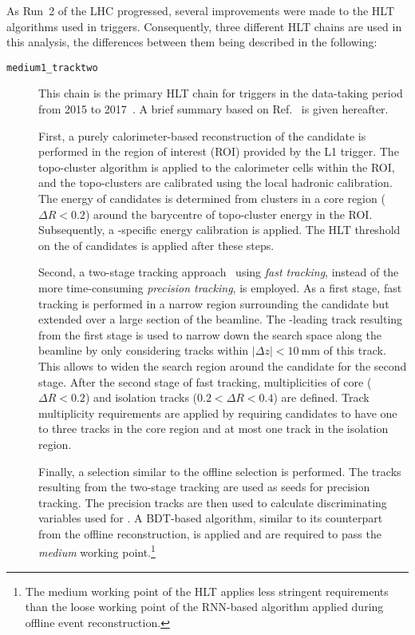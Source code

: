 As Run~2 of the LHC progressed, several improvements were made to the HLT
algorithms used in \tauhadvis triggers. Consequently, three different HLT chains
are used in this analysis, the differences between them being described in the
following:
\begin{description}

\item[\texttt{medium1\_tracktwo}] This chain is the primary HLT chain for
  \tauhadvis triggers in the data-taking period from 2015 to
  2017~\cite{ATL-DAQ-PUB-2016-001,ATL-DAQ-PUB-2017-001,ATL-DAQ-PUB-2018-002}. A
  brief summary based on Ref.~\cite{ATLAS-CONF-2017-061} is given hereafter.

  First, a purely calorimeter-based reconstruction of the \tauhadvis candidate
  is performed in the region of interest (ROI) provided by the L1 trigger. The
  topo-cluster algorithm is applied to the calorimeter cells within the ROI, and
  the topo-clusters are calibrated using the local hadronic calibration. The
  energy of \tauhadvis candidates is determined from clusters in a core region
  ($\Delta R < 0.2$) around the barycentre of topo-cluster energy in the
  ROI. Subsequently, a \tauhadvis-specific energy calibration is applied.
  The HLT threshold on the \pT of \tauhadvis candidates is applied after these
  steps.

  Second, a two-stage tracking approach~\cite{TRIG-2016-01,ATLAS-CONF-2017-061}
  using \emph{fast tracking}, instead of the more time-consuming \emph{precision
    tracking}, is employed. As a first stage, fast tracking is performed in a
  narrow region surrounding the \tauhadvis candidate but extended over a large
  section of the beamline. The \pT-leading track resulting from the first stage
  is used to narrow down the search space along the beamline by only considering
  tracks within $|\Delta z| < \SI{10}{\milli\metre}$ of this track. This allows
  to widen the search region around the \tauhadvis candidate for the second
  stage. After the second stage of fast tracking, multiplicities of core
  ($\Delta R < 0.2$) and isolation tracks ($0.2 < \Delta R < 0.4$) are
  defined. Track multiplicity requirements are applied by requiring \tauhadvis
  candidates to have one to three tracks in the core region and at most one
  track in the isolation region.

  Finally, a \tauhadvis selection similar to the offline \tauhadvis selection is
  performed. The tracks resulting from the two-stage tracking are used as seeds
  for precision tracking. The precision tracks are then used to calculate
  discriminating variables used for \tauid. A BDT-based \tauid algorithm,
  similar to its counterpart from the offline \tauhadvis reconstruction, is
  applied and \tauhadvis are required to pass the \emph{medium} working
  point.\footnote{The medium working point of the HLT \tauid applies less
    stringent requirements than the loose working point of the RNN-based \tauid
    algorithm applied during offline event reconstruction.}


\end{description}
